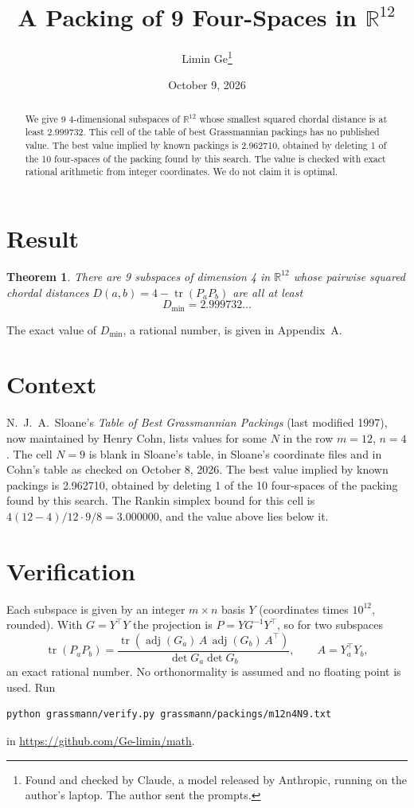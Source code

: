 \documentclass[11pt,a4paper]{article}
\title{A Packing of 9 Four-Spaces in $\mathbb{R}^{12}$}
\author{Limin Ge\thanks{Found and checked by Claude, a model released by Anthropic, running on the author's laptop. The author sent the prompts.}}
\date{October 9, 2026}
\newtheorem*{theorem}{Theorem}
\begin{document}
\maketitle
\begin{abstract}
We give 9 4-dimensional subspaces of $\mathbb{R}^{12}$ whose smallest squared chordal distance is at least 2.999732. This cell of the table of best Grassmannian packings has no published value. The best value implied by known packings is 2.962710, obtained by deleting 1 of the 10 four-spaces of the packing found by this search. The value is checked with exact rational arithmetic from integer coordinates. We do not claim it is optimal.
\end{abstract}

\section{Result}
\begin{theorem}
There are 9 subspaces of dimension 4 in $\mathbb{R}^{12}$ whose pairwise squared chordal distances $D(a,b) = 4 - \operatorname{tr}(P_aP_b)$ are all at least
\[ D_{\min} = 2.999732\ldots \]
\end{theorem}
The exact value of $D_{\min}$, a rational number, is given in Appendix~A.


\section{Context}
N.~J.~A.~Sloane's \emph{Table of Best Grassmannian Packings} (last modified 1997), now maintained by Henry Cohn, lists values for some $N$ in the row $m=12$, $n=4$. The cell $N=9$ is blank in Sloane's table, in Sloane's coordinate files and in Cohn's table as checked on October 8, 2026. The best value implied by known packings is 2.962710, obtained by deleting 1 of the 10 four-spaces of the packing found by this search. The Rankin simplex bound for this cell is $4(12-4)/12\cdot 9/8 = 3.000000$, and the value above lies below it.


\section{Verification}
Each subspace is given by an integer $m\times n$ basis $Y$ (coordinates times $10^{12}$, rounded). With $G=Y^\top Y$ the projection is $P=YG^{-1}Y^\top$, so for two subspaces
\[ \operatorname{tr}(P_aP_b)=\frac{\operatorname{tr}(\operatorname{adj}(G_a)\,A\,\operatorname{adj}(G_b)\,A^\top)}{\det G_a\det G_b},\qquad A=Y_a^\top Y_b, \]
an exact rational number. No orthonormality is assumed and no floating point is used. Run
\begin{verbatim}
python grassmann/verify.py grassmann/packings/m12n4N9.txt
\end{verbatim}
in \url{https://github.com/Ge-limin/math}.
\end{document}

